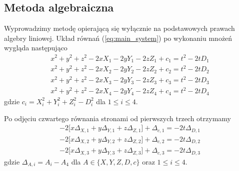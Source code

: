 \documentclass{article}
\begin{document}
\subsection{Metoda algebraiczna}
Wyprowadzimy metodę opierającą się wyłącznie na podstawowych prawach algebry liniowej.
Układ równań (\ref{eq:main_system}) po wykonaniu mnożeń wygląda następująco
\begin{equation}
\begin{aligned}
    x^2 + y^2 + z^2 -2xX_1 -2yY_1 -2zZ_1 + c_1 = t^2 -2tD_1 \\
    x^2 + y^2 + z^2 -2xX_2 -2yY_2 -2zZ_2 + c_2 = t^2 -2tD_2 \\
    x^2 + y^2 + z^2 -2xX_3 -2yY_3 -2zZ_3 + c_3 = t^2 -2tD_3 \\
    x^2 + y^2 + z^2 -2xX_4 -2yY_4 -2zZ_4 + c_4 = t^2 -2tD_4
\end{aligned}
\end{equation}
gdzie $c_i=X_i^2+Y_i^2+Z_i^2-D_i^2$ dla $1 \leq i \leq 4$.

Po odjęciu czwartego równania stronami od pierwszych trzech otrzymamy
\begin{equation}
\begin{aligned}
    \label{eq:modified_system}
    -2\big[ x\Delta_{X,1} + y\Delta_{Y, 1} + z\Delta_{Z, 1} ] + \Delta_{c, 1} = -2t\Delta_{D, 1} \\
    -2\big[ x\Delta_{X,2} + y\Delta_{Y, 2} + z\Delta_{Z, 2} ] + \Delta_{c, 2} = -2t\Delta_{D, 2} \\
    -2\big[ x\Delta_{X,3} + y\Delta_{Y, 3} + z\Delta_{Z, 3} ] + \Delta_{c, 3} = -2t\Delta_{D, 3}
\end{aligned}
\end{equation}
gdzie $\Delta_{A, i} = A_i - A_4$ dla $A \in \{X, Y, Z, D, c\}$ oraz $1 \leq i \leq 4$.
\end{document}
